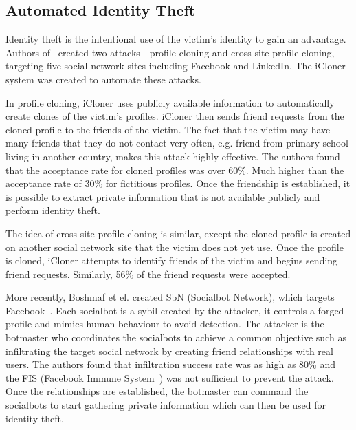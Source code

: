 \subsection{Automated Identity Theft}
Identity theft is the intentional use of the victim's identity to gain an
advantage. Authors of~\cite{bilge2009all} created two attacks - profile cloning
and cross-site profile cloning, targeting five social network sites including
Facebook and LinkedIn. The iCloner system was created to automate these attacks.

In profile cloning, iCloner uses publicly available information to automatically
create clones of the victim's profiles. iCloner then sends friend requests from
the cloned profile to the friends of the victim. The fact that the victim may
have many friends that they do not contact very often, e.g. friend from primary
school living in another country, makes this attack highly effective. The
authors found that the acceptance rate for cloned profiles was over 60\%. Much
higher than the acceptance rate of 30\% for fictitious profiles. Once the
friendship is established, it is possible to extract private information that is
not available publicly and perform identity theft.

The idea of cross-site profile cloning is similar, except the cloned profile is
created on another social network site that the victim does not yet use. Once
the profile is cloned, iCloner attempts to identify friends of the
victim and begins sending friend requests. Similarly, 56\% of the friend
requests were accepted. 

More recently, Boshmaf et el. created SbN (Socialbot Network), which targets
Facebook~\cite{boshmaf2011socialbot}. Each socialbot is a sybil created by the
attacker, it controls a forged profile and mimics human behaviour to avoid
detection. The attacker is the botmaster who coordinates the socialbots to
achieve a common objective such as infiltrating the target social network by creating
friend relationships with real users. The authors found that infiltration
success rate was as high as 80\% and the FIS (Facebook Immune
System~\cite{stein2011facebook}) was not sufficient to prevent the attack. Once
the relationships are established, the botmaster can command the socialbots to
start gathering private information which can then be used for identity theft.


